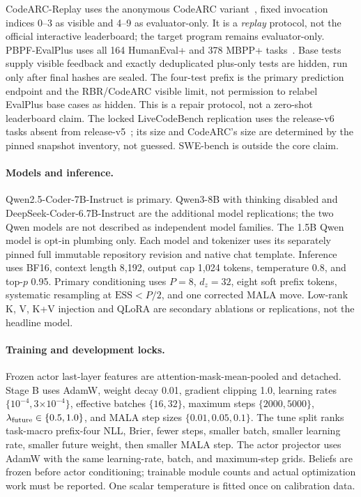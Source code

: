 CodeARC-Replay uses the anonymous CodeARC variant~\citep{codearc}, fixed
invocation indices 0--3 as visible and 4--9 as evaluator-only. It is a
\emph{replay} protocol, not the official interactive leaderboard; the target
program remains evaluator-only. PBPF-EvalPlus uses all 164 HumanEval+ and
378 MBPP+ tasks~\citep{evalplus}. Base tests supply visible feedback and
exactly deduplicated plus-only tests are hidden, run only after final hashes
are sealed. The four-test prefix is the primary prediction endpoint and the
RBR/CodeARC visible limit, not permission to relabel EvalPlus base cases as
hidden. This is a repair protocol, not a zero-shot leaderboard claim.
The locked LiveCodeBench replication uses the release-v6 tasks absent from
release-v5~\citep{livecodebench}; its size and CodeARC's size are determined by
the pinned snapshot inventory, not guessed. SWE-bench is outside the core claim.

\paragraph{Models and inference.}
Qwen2.5-Coder-7B-Instruct is primary. Qwen3-8B with thinking disabled and
DeepSeek-Coder-6.7B-Instruct are the additional model replications; the two Qwen
models are not described as independent model families. The 1.5B Qwen model is
opt-in plumbing only. Each model and tokenizer uses its separately pinned full
immutable repository revision and native chat template. Inference uses BF16,
context length 8,192, output cap 1,024 tokens, temperature
0.8, and top-$p$ 0.95. Primary conditioning uses $P=8$, $d_z=32$, eight soft
prefix tokens, systematic resampling at $\mathrm{ESS}<P/2$, and one corrected
MALA move. Low-rank K, V, K+V injection and QLoRA are secondary ablations or
replications, not the headline model.

\paragraph{Training and development locks.}
Frozen actor last-layer features are attention-mask-mean-pooled and detached.
Stage B uses AdamW, weight decay 0.01, gradient clipping 1.0, learning rates
$\{10^{-4},3\mathord\times10^{-4}\}$, effective batches $\{16,32\}$,
maximum steps $\{2000,5000\}$, $\lambda_{\rm future}\in\{0.5,1.0\}$, and
MALA step sizes $\{0.01,0.05,0.1\}$. The tune split ranks task-macro prefix-four
NLL, Brier, fewer steps, smaller batch, smaller learning rate, smaller future
weight, then smaller MALA step. The actor projector uses AdamW with the same
learning-rate, batch, and maximum-step grids. Beliefs are frozen before actor
conditioning; trainable module counts and actual optimization work must be
reported. One scalar temperature is fitted once on calibration data.

